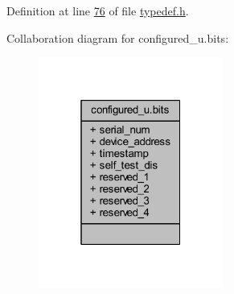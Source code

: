 Definition at line \hyperlink{a00001_source_l00076}{76} of file \hyperlink{a00001_source}{typedef.\+h}.



Collaboration diagram for configured\+\_\+u.\+bits\+:
\nopagebreak
\begin{figure}[H]
\begin{center}
\leavevmode
\includegraphics[width=172pt]{d0/da7/a00250}
\end{center}
\end{figure}
